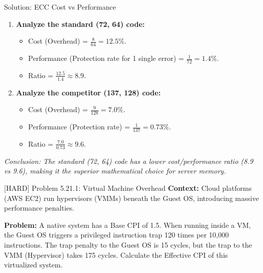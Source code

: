 \documentclass[aspectratio=169]{beamer}
\begin{document}
\begin{frame}{Solution: ECC Cost vs Performance}
\begin{enumerate}
    \item \textbf{Analyze the standard (72, 64) code:}
    \begin{itemize}
        \item Cost (Overhead) = $\frac{8}{64} = 12.5\%$.
        \item Performance (Protection rate for 1 single error) = $\frac{1}{72} = 1.4\%$.
        \item Ratio = $\frac{12.5}{1.4} \approx \mathbf{8.9}$.
    \end{itemize}
    \item \textbf{Analyze the competitor (137, 128) code:}
    \begin{itemize}
        \item Cost (Overhead) = $\frac{9}{128} = 7.0\%$.
        \item Performance (Protection rate) = $\frac{1}{137} = 0.73\%$.
        \item Ratio = $\frac{7.0}{0.73} \approx \mathbf{9.6}$.
    \end{itemize}
\end{enumerate}
\textit{Conclusion: The standard (72, 64) code has a lower cost/performance ratio (8.9 vs 9.6), making it the superior mathematical choice for server memory.}
\end{frame}

\begin{frame}{[HARD] Problem 5.21.1: Virtual Machine Overhead}
\textbf{Context:} Cloud platforms (AWS EC2) run hypervisors (VMMs) beneath the Guest OS, introducing massive performance penalties.
\vspace{0.5cm}

\textbf{Problem:}
A native system has a Base CPI of 1.5. When running inside a VM, the Guest OS triggers a privileged instruction trap 120 times per 10,000 instructions. The trap penalty to the Guest OS is 15 cycles, but the trap to the VMM (Hypervisor) takes 175 cycles. Calculate the Effective CPI of this virtualized system.
\end{frame}
\end{document}
